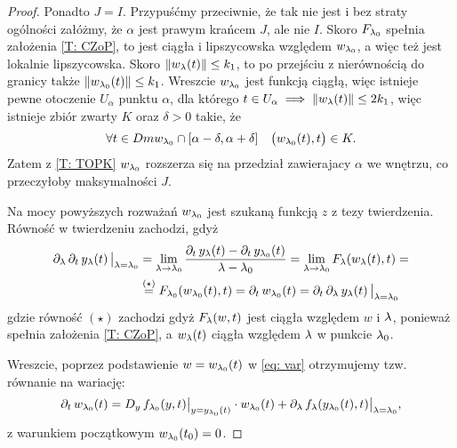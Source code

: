 \begin{proof}
  Ponadto $ J = I $. Przypuśćmy przeciwnie, że tak nie jest i bez straty ogólności załóżmy, że $\alpha$ jest prawym
  krańcem $J$, ale nie $I$. Skoro $F_{\l_0}$ spełnia założenia \ref{T: CZoP}, to jest ciągła i lipszycowska względem $w_{\l_0}$, a więc też jest lokalnie lipszycowska. Skoro $\norm{ w_\l(t) } \le k_1$, to po przejściu z nierównością do granicy także $\norm{ w_{\l_0}(t) } \le k_1$. Wreszcie $w_{\l_0}$ jest funkcją ciągłą, więc istnieje pewne otoczenie $U_\alpha$ punktu $\alpha$, dla
  którego $ t \in U_\alpha \implies \norm{ w_\l(t) } \le 2k_1$, więc istnieje zbiór zwarty $K$ oraz $\delta > 0$ takie, że 
%
  \begin{equation*}
    \forall t\in Dm w_{\l_0} \cap [\alpha - \delta, \alpha + \delta] \quad \big( w_{\l_0}(t), t \big) \in K.
  \end{equation*}
%
  Zatem z \ref{T: TOPK} $w_{\l_0}$ rozszerza się na przedział zawierajacy $\alpha$ we wnętrzu, co przeczyłoby maksymalności $J$.
  
  Na mocy powyższych rozważań $w_{\l_0}$ jest szukaną funkcją $z$ z tezy twierdzenia. Równość w twierdzeniu zachodzi, gdyż
%  
  \begin{align*}
  	\pd{\l} \pd{t} y_\l(t) \, \big\vert_{\l = \l_0} &= \lim_{\l \to \l_0} \frac{ \pd{t} y_\l(t) - \pd{t} y_{\l_0}(t) }{ \l - \l_0 } = \lim_{\l \to \l_0} F_\l(w_\l(t), t) = \\
  	& \overset{(\star)}{ = } F_{\l_0}(w_{\l_0}(t), t) = \pd{t} w_{\l_0}(t) = \pd{t} \pd{\l} y_\l(t) \, \big\vert_{\l = \l_0}
  \end{align*} 
%
  gdzie równość $(\star)$ zachodzi gdyż $F_\l(w, t)$ jest ciągła względem $w$ i $\l$, ponieważ spełnia założenia \ref{T: CZoP}, a $w_\l(t)$ ciągła względem $\l$ w punkcie $\l_0$.
  
  Wreszcie, poprzez podstawienie $w = w_{\l_0}(t)$ w \eqref{eq: var} otrzymujemy tzw. równanie na wariację:
%
  \begin{equation*}
  	\pd{t} w_{\l_0}(t) =  D_y \, f_{\l_0} (y, t) \big\vert_{ y = y_{\l_0}(t) } \cdot w_{\l_0}(t) + \pd{ \l } f_{\l}( y_{\l_0}(t), t) 
  	\big\vert_{ \l = \l_0 },
  \end{equation*} 
%
  z warunkiem początkowym $w_{\l_0}(t_0) = 0$. \qedhere
\end{proof}

%

